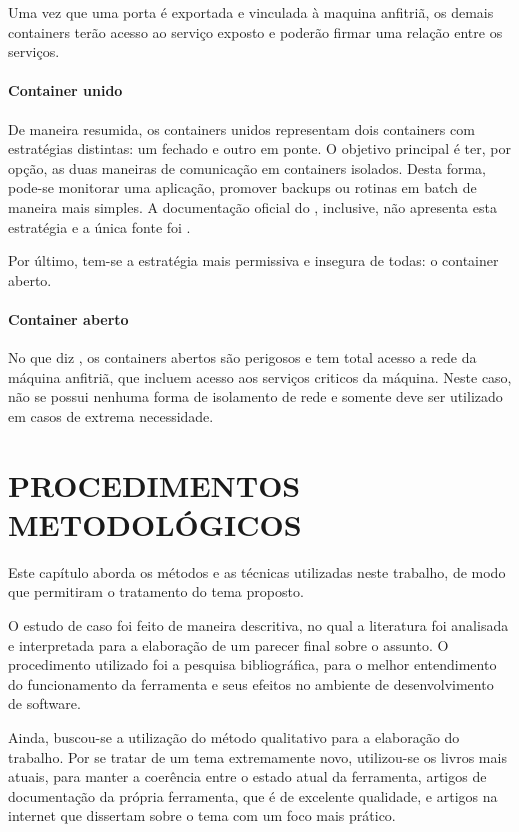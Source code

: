 \documentclass[
	12pt,				%
	openright,			%
	oneside,			%
	a4paper,			%
	chapter=TITLE,		%
	section=TITLE,		%
	english,			%
	french,				%
	spanish,			%
	brazil				%
	]{abntex2}
\begin{document}
Uma vez que uma porta é exportada e vinculada à maquina anfitriã, os demais containers terão acesso ao serviço exposto e poderão firmar uma relação entre os serviços.

\subsubsection{Container unido}

De maneira resumida, os containers unidos representam dois containers com estratégias distintas: um fechado e outro em ponte. O objetivo principal é ter, por opção, as duas maneiras de comunicação em containers isolados. Desta forma, pode-se monitorar uma aplicação, promover backups ou rotinas em batch de maneira mais simples. A documentação oficial do , inclusive, não apresenta esta estratégia e a única fonte foi .

Por último, tem-se a estratégia mais permissiva e insegura de todas: o container aberto.

\subsubsection{Container aberto}

No que diz , os containers abertos são perigosos e tem total acesso a rede da máquina anfitriã, que incluem acesso aos serviços criticos da máquina. Neste caso, não se possui nenhuma forma de isolamento de rede e somente deve ser utilizado em casos de extrema necessidade. 

\chapter{PROCEDIMENTOS METODOLÓGICOS}

Este capítulo aborda os métodos e as técnicas utilizadas neste trabalho, de modo que permitiram o tratamento do tema proposto.

O estudo de caso foi feito de maneira descritiva, no qual a literatura foi analisada e interpretada para a elaboração de um parecer final sobre o assunto. O procedimento utilizado foi a pesquisa bibliográfica, para o melhor entendimento do funcionamento da ferramenta e seus efeitos no ambiente de desenvolvimento de software.

Ainda, buscou-se a utilização do método qualitativo para a elaboração do trabalho. Por se tratar de um tema extremamente novo, utilizou-se os livros mais atuais, para manter a coerência entre o estado atual da ferramenta, artigos de documentação da própria ferramenta, que é de excelente qualidade, e artigos na internet que dissertam sobre o tema com um foco mais prático.
\end{document}
